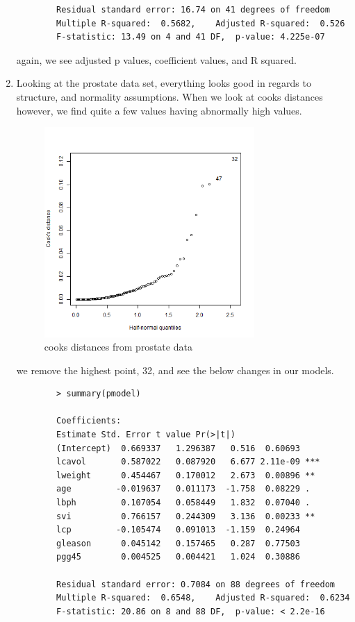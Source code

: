 \documentclass[11pt]{article}
\begin{document}
\begin{enumerate}
\begin{verbatim}
		Residual standard error: 16.74 on 41 degrees of freedom
		Multiple R-squared:  0.5682,	Adjusted R-squared:  0.526 
		F-statistic: 13.49 on 4 and 41 DF,  p-value: 4.225e-07
	\end{verbatim}
	again, we see adjusted p values, coefficient values, and R squared.
	\item
	Looking at the prostate data set, everything looks good in regards to structure, and normality assumptions. When we look at cooks distances however, we find quite a few values having abnormally high values.
	\begin{figure}[H]
		\centering
		\includegraphics[width=8cm,height=8cm]{prostateCD.png}
		\caption[prostateCD]{cooks distances from prostate data}
		\label{CD check on teen gamb}
	\end{figure}
	we remove the highest point, 32, and see the below changes in our models. 
	\begin{verbatim}
		> summary(pmodel)

		Coefficients:
		Estimate Std. Error t value Pr(>|t|)    
		(Intercept)  0.669337   1.296387   0.516  0.60693    
		lcavol       0.587022   0.087920   6.677 2.11e-09 ***
		lweight      0.454467   0.170012   2.673  0.00896 ** 
		age         -0.019637   0.011173  -1.758  0.08229 .  
		lbph         0.107054   0.058449   1.832  0.07040 .  
		svi          0.766157   0.244309   3.136  0.00233 ** 
		lcp         -0.105474   0.091013  -1.159  0.24964    
		gleason      0.045142   0.157465   0.287  0.77503    
		pgg45        0.004525   0.004421   1.024  0.30886    
		
		Residual standard error: 0.7084 on 88 degrees of freedom
		Multiple R-squared:  0.6548,	Adjusted R-squared:  0.6234 
		F-statistic: 20.86 on 8 and 88 DF,  p-value: < 2.2e-16
		

\end{verbatim}
\end{enumerate}
\end{document}
